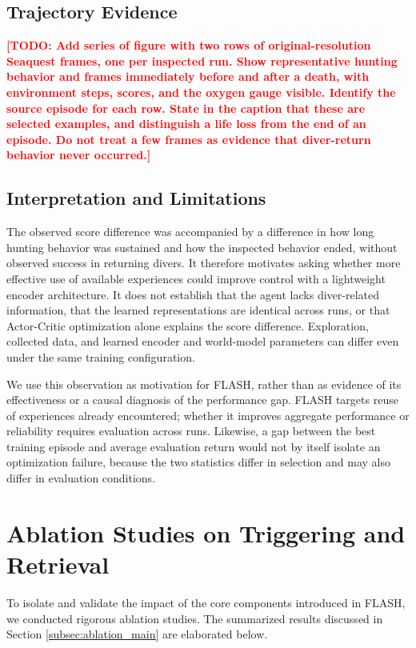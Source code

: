 \documentclass{article} %
\newcommand{\todo}[1]{\textcolor{red}{\textbf{[TODO: #1]}}}
\begin{document}
\subsection{Trajectory Evidence}
\todo{Add series of figure with two rows of original-resolution Seaquest frames, one per inspected run. Show representative hunting behavior and frames immediately before and after a death, with environment steps, scores, and the oxygen gauge visible. Identify the source episode for each row. State in the caption that these are selected examples, and distinguish a life loss from the end of an episode. Do not treat a few frames as evidence that diver-return behavior never occurred.}

\subsection{Interpretation and Limitations}
The observed score difference was accompanied by a difference in how long hunting behavior was sustained and how the inspected behavior ended, without observed success in returning divers. It therefore motivates asking whether more effective use of available experiences could improve control with a lightweight encoder architecture. It does not establish that the agent lacks diver-related information, that the learned representations are identical across runs, or that Actor-Critic optimization alone explains the score difference. Exploration, collected data, and learned encoder and world-model parameters can differ even under the same training configuration.

We use this observation as motivation for FLASH, rather than as evidence of its effectiveness or a causal diagnosis of the performance gap. FLASH targets reuse of experiences already encountered; whether it improves aggregate performance or reliability requires evaluation across runs. Likewise, a gap between the best training episode and average evaluation return would not by itself isolate an optimization failure, because the two statistics differ in selection and may also differ in evaluation conditions.

\section{Ablation Studies on Triggering and Retrieval}
\label{sec:appendix_ablation_studies}
To isolate and validate the impact of the core components introduced in FLASH, we conducted rigorous ablation studies. The summarized results discussed in Section \ref{subsec:ablation_main} are elaborated below.
\end{document}
